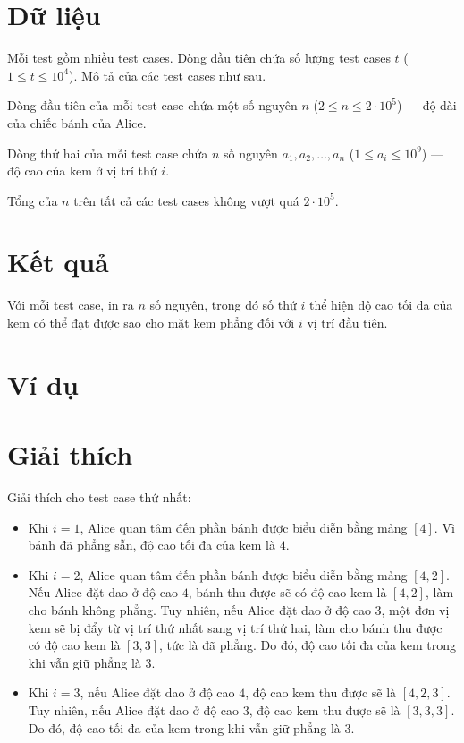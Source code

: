 \documentclass[11pt]{article}
\begin{document}
\section*{Dữ liệu}
Mỗi test gồm nhiều test cases. Dòng đầu tiên chứa số lượng test cases $t$ ($1 \le t \le 10^4$). Mô tả của các test cases như sau.

Dòng đầu tiên của mỗi test case chứa một số nguyên $n$ ($2 \le n \le 2\cdot 10^5$) — độ dài của chiếc bánh của Alice.

Dòng thứ hai của mỗi test case chứa $n$ số nguyên $a_1, a_2, \ldots, a_n$ ($1 \le a_i \le 10^9$) — độ cao của kem ở vị trí thứ $i$.

Tổng của $n$ trên tất cả các test cases không vượt quá $2 \cdot 10^5$.

\section*{Kết quả}
Với mỗi test case, in ra $n$ số nguyên, trong đó số thứ $i$ thể hiện độ cao tối đa của kem có thể đạt được sao cho mặt kem phẳng đối với $i$ vị trí đầu tiên.

\section*{Ví dụ}
\begin{example}
%
\end{example}

\section*{Giải thích}
Giải thích cho test case thứ nhất:
\begin{itemize}
    \item Khi $i = 1$, Alice quan tâm đến phần bánh được biểu diễn bằng mảng $[4]$. Vì bánh đã phẳng sẵn, độ cao tối đa của kem là $4$.
    \item Khi $i = 2$, Alice quan tâm đến phần bánh được biểu diễn bằng mảng $[4, 2]$. Nếu Alice đặt dao ở độ cao $4$, bánh thu được sẽ có độ cao kem là $[4, 2]$, làm cho bánh không phẳng. Tuy nhiên, nếu Alice đặt dao ở độ cao $3$, một đơn vị kem sẽ bị đẩy từ vị trí thứ nhất sang vị trí thứ hai, làm cho bánh thu được có độ cao kem là $[3, 3]$, tức là đã phẳng. Do đó, độ cao tối đa của kem trong khi vẫn giữ phẳng là $3$.
    \item Khi $i = 3$, nếu Alice đặt dao ở độ cao $4$, độ cao kem thu được sẽ là $[4, 2, 3]$. Tuy nhiên, nếu Alice đặt dao ở độ cao $3$, độ cao kem thu được sẽ là $[3, 3, 3]$. Do đó, độ cao tối đa của kem trong khi vẫn giữ phẳng là $3$.
\end{itemize}
\end{document}

